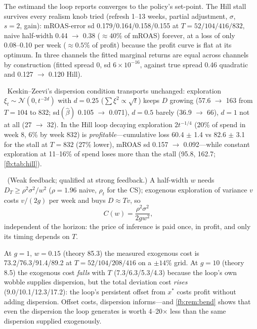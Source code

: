 The estimand the loop reports converges to the policy's set-point. The Hill stall survives every realism knob  tried (refresh 1--13 weeks, partial adjustment, $\sigma$, $s = 2$, gain): mROAS-error sd 0.179/0.164/0.158/0.155 at $T = 52/104/416/832$, naive half-width 0.44 $\to$ 0.38 ($\approx 40\%$ of mROAS) forever, at a loss of only 0.08--0.10 per week ($\approx 0.5\%$ of profit) because the profit curve is flat at its optimum. In three channels the fitted marginal returns are equal across channels by construction (fitted spread 0, sd $6\times10^{-16}$, against true spread 0.46 quadratic and 0.127 $\to$ 0.120 Hill).

\begin{proposition}
\label{fb:prop:explore}
\tagTransported\ Keskin--Zeevi's dispersion condition transports unchanged: exploration $\xi_t \sim \mathcal N(0, t^{-2d})$ with $d = 0.25$ ($\sum\xi^2 \propto \sqrt t$) keeps $D$ growing (57.6 $\to$ 163 from $T = 104$ to 832; sd$(\hat\beta)$ 0.105 $\to$ 0.071), $d = 0.5$ barely (36.9 $\to$ 66), $d = 1$ not at all (27 $\to$ 32). In the Hill loop decaying exploration $2t^{-1/4}$ (20\% of spend in week 8, 6\% by week 832) is \emph{profitable}---cumulative loss 60.4 $\pm$ 1.4 vs 82.6 $\pm$ 3.1 for the stall at $T = 832$ (27\% lower), mROAS sd 0.157 $\to$ 0.092---while constant exploration at 11--16\% of spend loses more than the stall (95.8, 162.7; \cref{fb:tab:hill}).
\end{proposition}

\begin{law}
\label{fb:law:price}
\tagEstablished\ (Weak feedback; qualified at strong feedback.) A half-width $w$ needs $D_T \ge \rho^2\sigma^2/w^2$ ($\rho = 1.96$ naive, $\rho_t$ for the CS); exogenous exploration of variance $v$ costs $v/(2g)$ per week and buys $D \approx Tv$, so
\begin{equation}
C(w) = \frac{\rho^2\sigma^2}{2gw^2},
\label{eq:fb:price}
\end{equation}
independent of the horizon: the price of inference is paid once, in profit, and only its timing depends on $T$.
\end{law}

At $g = 1$, $w = 0.15$ (theory 85.3) the measured exogenous cost is 73.2/76.3/91.4/89.2 at $T = 52/104/208/416$ on a $\pm 14\%$ grid. At $g = 10$ (theory 8.5) the exogenous cost \emph{falls} with $T$ (7.3/6.3/5.3/4.3) because the loop's own wobble supplies dispersion, but the total deviation cost \emph{rises} (9.0/10.1/12.3/17.2): the loop's persistent offset from $x^*$ costs profit without adding dispersion. Offset costs, dispersion informs---and \cref{fb:rem:bend} shows that even the dispersion the loop generates is worth 4--20$\times$ less than the same dispersion supplied exogenously.

